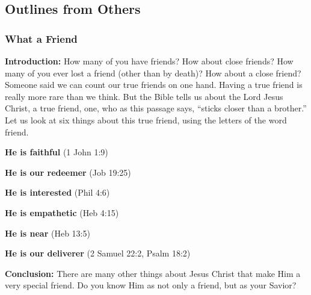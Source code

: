 \subsection{Outlines from Others}

\subsubsection{What a Friend}
\textbf{Introduction: } How many of you have friends? How about close friends? How many of you ever lost a friend (other than by death)? How about a close friend? Someone said we can count our true friends on one hand. Having a true friend is really more rare than we think. But the Bible tells us about the Lord Jesus Christ, a true friend, one, who as this passage says, ``sticks closer than a brother.'' Let us look at six things about this true friend, using the letters of the word friend.
\begin{compactenum}[I.]
    \item \textbf{He is faithful} (1 John 1:9)
    \item \textbf{He is our redeemer} (Job 19:25)
    \item \textbf{He is interested} (Phil 4:6)
    \item \textbf{He is empathetic} (Heb 4:15)
    \item \textbf{He is near} (Heb 13:5)
    \item \textbf{He is our deliverer} (2 Samuel 22:2, Psalm 18:2)
\end{compactenum}
\textbf{Conclusion: } There are many other things about Jesus Christ that make Him a very special friend. Do you know Him as not only a friend, but as your Savior?

